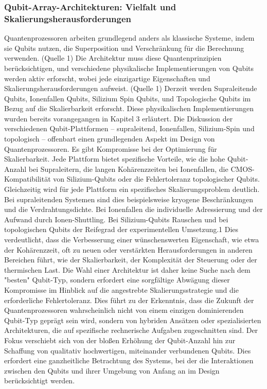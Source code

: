 \subsubsection{Qubit-Array-Architekturen: Vielfalt und Skalierungsherausforderungen}
Quantenprozessoren arbeiten grundlegend anders als klassische Systeme, indem sie Qubits nutzen, die Superposition und Verschränkung für die Berechnung verwenden. (Quelle 1) Die Architektur muss diese Quantenprinzipien berücksichtigen, und verschiedene physikalische Implementierungen von Qubits werden aktiv erforscht, wobei jede einzigartige Eigenschaften und Skalierungsherausforderungen aufweist. (Quelle 1)
Derzeit werden Supraleitende Qubits, Ionenfallen Qubits, Silizium Spin Qubits, und Topologische Qubits im Bezug auf die Skalierbarkeit erforscht. Diese physikalischen Implementierungen wurden bereits vorangegangen in Kapitel 3 erläutert. Die Diskussion der verschiedenen Qubit-Plattformen – supraleitend, Ionenfallen, Silizium-Spin und topologisch – offenbart einen grundlegenden Aspekt im Design von Quantenprozessoren. Es gibt Kompromisse bei der Optimierung für Skalierbarkeit. Jede Plattform bietet spezifische Vorteile, wie die hohe Qubit-Anzahl bei Supraleitern, die langen Kohärenzzeiten bei Ionenfallen, die CMOS-Kompatibilität von Silizium-Qubits oder die  Fehlertoleranz topologischer Qubits. Gleichzeitig wird für jede Plattform ein spezifisches Skalierungsproblem deutlich. Bei supraleitenden Systemen sind dies beispielsweise kryogene Beschränkungen und die Verdrahtungsdichte. Bei Ionenfallen die individuelle Adressierung und der Aufwand durch Ionen-Shuttling. Bei Silizium-Qubits Rauschen und bei topologischen Qubits der Reifegrad der experimentellen Umsetzung.1 Dies verdeutlicht, dass die Verbesserung einer wünschenswerten Eigenschaft, wie etwa der Kohärenzzeit, oft zu neuen oder verstärkten Herausforderungen in anderen Bereichen führt, wie der Skalierbarkeit, der Komplexität der Steuerung oder der thermischen Last. Die Wahl einer Architektur ist daher keine Suche nach dem "besten" Qubit-Typ, sondern erfordert eine sorgfältige Abwägung dieser Kompromisse im Hinblick auf die angestrebte Skalierungsstrategie und die erforderliche Fehlertoleranz. Dies führt zu der Erkenntnis, dass die Zukunft der Quantenprozessoren wahrscheinlich nicht von einem einzigen dominierenden Qubit-Typ geprägt sein wird, sondern von hybriden Ansätzen oder spezialisierten Architekturen, die auf spezifische rechnerische Aufgaben zugeschnitten sind. Der Fokus verschiebt sich von der bloßen Erhöhung der Qubit-Anzahl hin zur Schaffung von qualitativ hochwertigen, miteinander verbundenen Qubits. Dies erfordert eine ganzheitliche Betrachtung des Systems, bei der die Interaktionen zwischen den Qubits und ihrer Umgebung von Anfang an im Design berücksichtigt werden.
